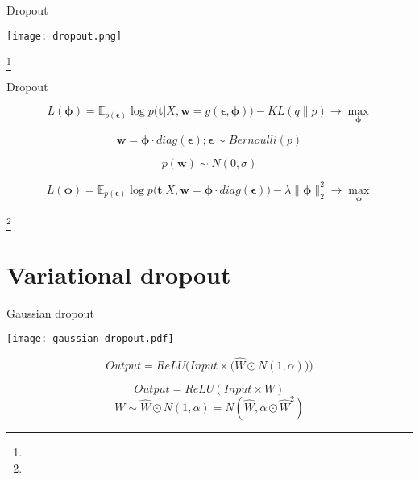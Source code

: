 \documentclass[14pt,mathserif,aspectratio=43,unicode]{beamer}
\newcommand\articlenote[1]{%
  \begingroup%
  \renewcommand\thefootnote{}\footnote{#1}%
  \addtocounter{footnote}{-1}%
  \endgroup%
}
\newcommand{\w}{\mathbf{w}}
\newcommand{\T}{\mathbf{t}}
\newcommand{\pHi}{\mathbf{\phi}}
\newcommand{\Eps}{\mathbf{\epsilon}}
\begin{document}

\begin{frame}{Dropout}

    \begin{center}
        \texttt{[image: dropout.png]}
    \end{center}
    
    \articlenote{}

\end{frame}

\begin{frame}{Dropout}

    $$ L(\pHi) = \mathbb{E}_{p(\Eps)} \log p\big(\T|X,\w=g(\Eps, \pHi)\big) - KL(q\|p) \rightarrow \max_{\pHi} $$
    
    \pause
     
    $$ \w = \pHi \cdot diag(\Eps); \Eps \sim Bernoulli(p) $$
    
    \pause
    
    $$ p(\w) \sim N(0, \sigma) $$
    
    \pause
    
    $$ L(\pHi) = \mathbb{E}_{p(\Eps)} \log p\big(\T|X,\w=\pHi \cdot diag(\Eps)\big) - \lambda\|\pHi\|_2^2 \rightarrow \max_{\pHi} $$

    \articlenote{}

\end{frame}


\section{Variational dropout}

\begin{frame}{Gaussian dropout}

    \begin{center}
        \texttt{[image: gaussian-dropout.pdf]}
    \end{center}

    $$ Output = ReLU\Big(Input \times \big(\hat{W} \odot N(1, \alpha)\big)\Big) $$
    
    \pause
    
    $$ Output = ReLU(Input \times W)$$
    $$ W \sim \hat{W} \odot N(1, \alpha) = N(\hat{W}, \alpha \odot \hat{W}^2) $$

\end{frame}
\end{document}
